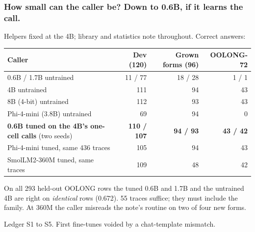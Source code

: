 \documentclass[aspectratio=169,11pt]{beamer}
\newcommand{\source}[1]{\vfill{\scriptsize\color{Gray}#1\par}}
\begin{document}
\begin{frame}[t]
\frametitle{How small can the caller be? Down to 0.6B, if it learns the call.}
Helpers fixed at the 4B; library and statistics note throughout. Correct answers:
\begin{center}\footnotesize
\begin{tabular}{@{}lrrr@{}}
\toprule
Caller & Dev (120) & Grown forms (96) & OOLONG-72 \\
\midrule
0.6B / 1.7B untrained & 11 / 77 & 18 / 28 & 1 / 1 \\
4B untrained & 111 & 94 & 43 \\
8B (4-bit) untrained & 112 & 93 & 43 \\
Phi-4-mini (3.8B) untrained & 69 & 94 & 0 \\
\midrule
\textbf{0.6B tuned on the 4B's one-cell calls} (two seeds) & \textbf{110 / 107} & \textbf{94 / 93} & \textbf{43 / 42} \\
Phi-4-mini tuned, same 436 traces & 105 & 94 & 43 \\
SmolLM2-360M tuned, same traces & 109 & 48 & 42 \\
\bottomrule
\end{tabular}
\end{center}
\small On all 293 held-out OOLONG rows the tuned 0.6B and 1.7B and the untrained 4B are right on \emph{identical} rows (0.672).
55 traces suffice; they must include the family. At 360M the caller misreads the note's routine on two of four new forms.
\source{Ledger S1 to S5. First fine-tunes voided by a chat-template mismatch.}
\end{frame}
\end{document}

